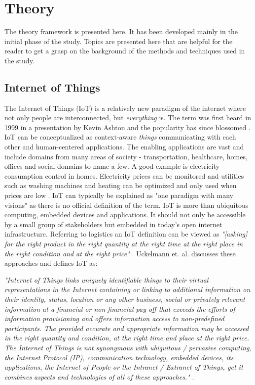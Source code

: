 \chapter{Theory}
\label{cha:theory}

The theory framework is presented here. It has been developed mainly in the
initial phase of the study. Topics are presented here that are helpful for the
reader to get a grasp on the background of the methods and techniques used in
the study.

\section{Internet of Things}

The Internet of Things (IoT) is a relatively new paradigm of the internet where
not only people are interconnected, but \textit{everything} is. The term was
first heard in 1999 in a presentation by Kevin Ashton \cite{ashton2011internet}
and the popularity has since blossomed \cite{gubbi2013internet}. IoT can be
conceptualized as context-aware \textit{things} communicating with each other
and human-centered applications. The enabling applications are vast and include
domains from many areas of society - transportation, healthcare, homes, offices
and social domains to name a few. A good example is electricity consumption
control in homes. Electricity prices can be monitored and utilities such as
washing machines and heating can be optimized and only used when prices are low
\cite{atzori2010internet}. IoT can typically be explained as "one paradigm with
many visions" \cite{atzori2010internet} as there is no official definition of
the term. IoT is more than ubiquitous computing, embedded devices and
applications. It should not only be accessible by a small group of stakeholders
but embedded in today's open internet infrastructure. Referring to logistics an
IoT definition can be viewed as \textit{"[asking] for the right product in the
right quantity at the right time at the right place in the right condition and
at the right price"} \cite{uckelmann2011architectural}. Uckelmann et. al.
discusses these approaches and defines IoT as:

\begin{center}
\textit{"Internet of Things links
uniquely identifiable things to their virtual representations in the Internet
containing or linking to additional information on their identity, status,
location or any other business, social or privately relevant information at a
financial or non-financial pay-off that exceeds the efforts of information
provisioning and offers information access to non-predefined participants. The
provided accurate and appropriate information may be accessed in the right
quantity and condition, at the right time and place at the right price. The
Internet of Things is not synonymous with ubiquitous / pervasive computing, the
Internet Protocol (IP), communication technology, embedded devices, its
applications, the Internet of People or the Intranet / Extranet of Things, yet
it combines aspects and technologies of all of these approaches."}
\cite{uckelmann2011architectural}.
\end{center}

